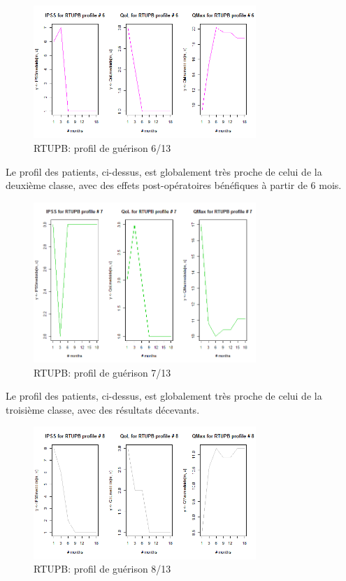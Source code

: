 \begin{figure}[H]
\centering
\includegraphics[width=0.75\textwidth]{../Fig/RTUPB/rtupb-profil-post-06.png}
\caption{RTUPB: profil de guérison 6/13}
\end{figure}

Le profil des patients, ci-dessus, est globalement très proche de celui de la deuxième classe, avec des effets post-opératoires bénéfiques à partir de 6 mois.

\begin{figure}[H]
\centering
\includegraphics[width=0.75\textwidth]{../Fig/RTUPB/rtupb-profil-post-07.png}
\caption{RTUPB: profil de guérison 7/13}
\end{figure}

Le profil des patients, ci-dessus, est globalement très proche de celui de la troisième classe, avec des résultats décevants.

\begin{figure}[H]
\centering
\includegraphics[width=0.75\textwidth]{../Fig/RTUPB/rtupb-profil-post-08.png}
\caption{RTUPB: profil de guérison 8/13}
\end{figure}

